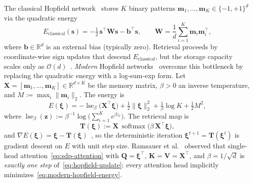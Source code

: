 The classical Hopfield network~\cite{hopfieldNeuralNetworksPhysical1982} stores $K$ binary patterns $\mathbf{m}_1,\dots,\mathbf{m}_K\in\{-1,+1\}^d$ via the quadratic energy
\begin{equation}\label{eq:classical-hopfield}
    E_{\mathrm{classical}}(\mathbf{s})
    = -\tfrac{1}{2}\,\mathbf{s}^{\top}\mathbf{W}\mathbf{s}
      - \mathbf{b}^{\top}\mathbf{s},
    \qquad
    \mathbf{W} = \frac{1}{d}\sum_{i=1}^{K}\mathbf{m}_i\mathbf{m}_i^{\top},
\end{equation}
where $\mathbf{b}\in\mathbb{R}^d$ is an external bias (typically zero). Retrieval proceeds by coordinate-wise sign updates that descend $E_{\mathrm{classical}}$, but the storage capacity scales only as $\mathcal{O}(d)$~\cite{amitStoringInfiniteNumbers1985}. \textit{Modern} Hopfield networks~\cite{ramsauerHopfieldNetworksAll2021} overcome this bottleneck by replacing the quadratic energy with a log-sum-exp form. Let $\mathbf{X}=[\mathbf{m}_1,\dots,\mathbf{m}_K]\in\mathbb{R}^{d\times K}$ be the memory matrix, $\beta>0$ an inverse temperature, and $M:=\max_i\|\mathbf{m}_i\|_2$. The energy is
\begin{equation}\label{eq:modern-hopfield-energy}
    E(\boldsymbol{\xi})
    = -\operatorname{lse}_\beta\!\bigl(\mathbf{X}^{\top}\boldsymbol{\xi}\bigr)
      + \tfrac{1}{2}\|\boldsymbol{\xi}\|_2^2
      + \tfrac{1}{\beta}\log K
      + \tfrac{1}{2}M^2,
\end{equation}
where $\operatorname{lse}_\beta(\mathbf{z}):=\beta^{-1}\log\bigl(\sum_{i=1}^{K}e^{\beta z_i}\bigr)$. The retrieval map is
\begin{equation}\label{eq:hopfield-update}
    \mathbf{T}(\boldsymbol{\xi})
    := \mathbf{X}\,\operatorname{softmax}\!\bigl(\beta\,\mathbf{X}^{\top}\boldsymbol{\xi}\bigr),
\end{equation}
and $\nabla E(\boldsymbol{\xi})=\boldsymbol{\xi}-\mathbf{T}(\boldsymbol{\xi})$~\cite{ramsauerHopfieldNetworksAll2021}, so the deterministic iteration $\boldsymbol{\xi}^{t+1}=\mathbf{T}(\boldsymbol{\xi}^t)$ is gradient descent on $E$ with unit step size. Ramsauer et al.~\cite{ramsauerHopfieldNetworksAll2021} observed that single-head attention~\eqref{eq:sdp-attention} with $\mathbf{Q}=\boldsymbol{\xi}^{\top}$, $\mathbf{K}=\mathbf{V}=\mathbf{X}^{\top}$, and $\beta=1/\sqrt{d}$ is \emph{exactly one step} of~\eqref{eq:hopfield-update}: every attention head implicitly minimizes~\eqref{eq:modern-hopfield-energy}.

